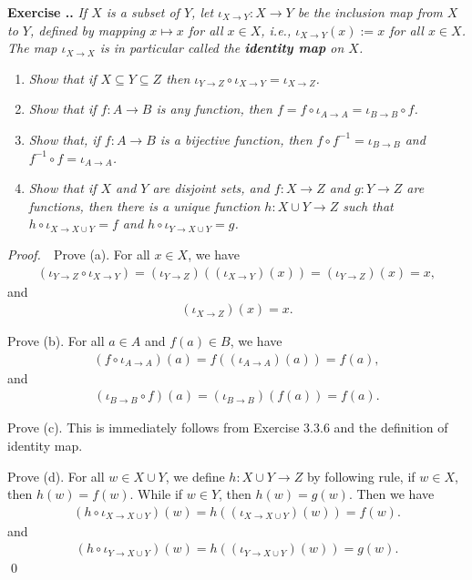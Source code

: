 \documentclass{book}
\newcommand{\pff}{\vspace{.25em}\noindent\emph{Proof.}~~}
\newcounter{Exercise}[section]
\renewcommand{\theExercise}{\thesection.\arabic{Exercise}.}
\newcommand{\new}{\vspace{1.5em}\noindent\textbf{{Exercise \stepcounter{Exercise}\textbf{\theExercise}}} }
\begin{document}
\new\emph{If $X$ is a subset of $Y$, let $\iota_{X\to Y}:X\to Y$ be the inclusion map from $X$ to $Y$, defined by mapping $x\mapsto x$ for all $x\in X$, i.e., $\iota_{X\to Y}(x):= x$ for all $x\in X$. The map $\iota_{X\to X}$ is in particular called the \textbf{identity map} on $X$.}
\begin{enumerate}
   \item \emph{Show that if $X\subseteq Y\subseteq Z$ then $\iota_{Y\to Z}\circ \iota_{X\to Y}=\iota_{X\to Z}$.}
   \item \emph{Show that if $f:A\to B$ is any function, then $f=f\circ\iota_{A\to A}=\iota_{B\to B}\circ f$.}
   \item \emph{Show that, if $f:A\to B$ is a bijective function, then $f\circ f^{-1}=\iota_{B\to B}$ and $f^{-1}\circ f=\iota_{A\to A}$.}
   \item \emph{Show that if $X$ and $Y$ are disjoint sets, and $f:X\to Z$ and $g:Y\to Z$ are functions, then there is a unique function $h:X\cup Y\to Z$ such that $h\circ\iota_{X\to X\cup Y}=f$ and $h\circ\iota_{Y\to X\cup Y}=g$.}
\end{enumerate}
\pff Prove (a). For all $x\in X$, we have 
    \begin{align*}
        (\iota_{Y\to Z}\circ \iota_{X\to Y})=(\iota_{Y\to Z})((\iota_{X\to Y})(x))=(\iota_{Y\to Z})(x)=x,
    \end{align*}
and
    \begin{align*}
        (\iota_{X\to Z})(x)=x.
    \end{align*}

Prove (b). For all $a\in A$ and $f(a)\in B$, we have
    \begin{align*}
        (f\circ\iota_{A\to A})(a)=f((\iota_{A\to A})(a))=f(a),
    \end{align*}
and
    \begin{align*}
        (\iota_{B\to B}\circ f)(a)=(\iota_{B\to B})(f(a))=f(a).
    \end{align*}

Prove (c). This is immediately follows from Exercise 3.3.6 and the definition of identity map.

Prove (d). For all $w\in X\cup Y$, we define $h:X\cup Y\to Z$ by following rule, if $w\in X$, then $h(w)=f(w)$. While if $w\in Y$, then $h(w)=g(w)$. Then we have
    \begin{align*}
        (h\circ\iota_{X\to X\cup Y})(w)=h((\iota_{X\to X\cup Y})(w))=f(w).
    \end{align*}
and
    \begin{align*}
        (h\circ\iota_{Y\to X\cup Y})(w)=h((\iota_{Y\to X\cup Y})(w))=g(w).
    \end{align*}\qed
\end{document}
